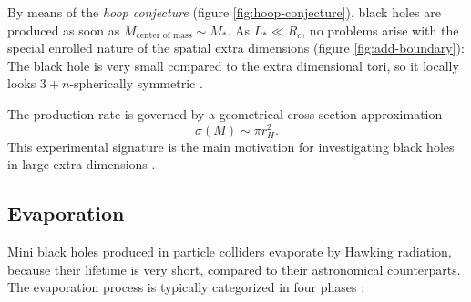 \documentclass[12pt,a4paper]{report}
\numberwithin{equation}{chapter}
\begin{document}
By means of the \emph{hoop conjecture} (figure \ref{fig:hoop-conjecture}), black holes are produced as soon as $M_\text{center of mass} \sim M_*$. As $L_* \ll R_c$, no problems arise with the special enrolled nature of the spatial extra dimensions (figure \ref{fig:add-boundary}): The black hole is very small compared to the extra dimensional tori, so it locally looks $3+n$-spherically symmetric \cite{Hossenfelder2004}.

The production rate is governed by a geometrical cross section approximation
\begin{equation}
\sigma(M) \sim \pi r_H^2.
\end{equation}
This experimental signature is the main motivation for investigating black holes in large extra dimensions \cite{Gingrich:2010ed,Giddings2014,ScardigliCasadio2014}.

%


\subsection{Evaporation}\label{sec:evaporation}
Mini black holes produced in particle colliders evaporate by Hawking radiation, because their lifetime is very short, compared to their astronomical counterparts. The evaporation process is typically categorized in four phases \cite{miniReview,KBH2005,Hossenfelder2004}:
\end{document}

